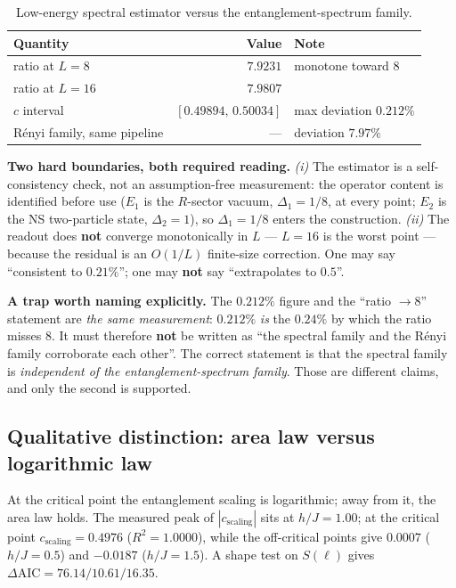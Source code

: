 \documentclass[11pt,a4paper]{article}
\begin{document}
\begin{table}[h]
\centering\small
\begin{tabular}{@{}lrl@{}}
\toprule
\textbf{Quantity} & \textbf{Value} & \textbf{Note} \\
\midrule
ratio at $L{=}8$  & $7.9231$ & monotone toward 8 \\
ratio at $L{=}16$ & $7.9807$ & \\
$c$ interval & $[0.49894,\,0.50034]$ & max deviation $0.212\%$ \\
Rényi family, same pipeline & --- & deviation $7.97\%$ \\
\bottomrule
\end{tabular}
\caption{Low-energy spectral estimator versus the entanglement-spectrum family.}
\label{tab:second}
\end{table}

\noindent\textbf{Two hard boundaries, both required reading.}
\emph{(i)} The estimator is a self-consistency check, not an assumption-free
measurement: the operator content is identified before use ($E_1$ is the $R$-sector
vacuum, $\Delta_1 = 1/8$, at every point; $E_2$ is the NS two-particle state,
$\Delta_2 = 1$), so $\Delta_1 = 1/8$ enters the construction.
\emph{(ii)} The readout does \textbf{not} converge monotonically in $L$ ---
$L{=}16$ is the worst point --- because the residual is an $O(1/L)$ finite-size
correction. One may say ``consistent to $0.21\%$''; one may \textbf{not} say
``extrapolates to $0.5$''.

\medskip
\noindent\textbf{A trap worth naming explicitly.} The $0.212\%$ figure and the
``ratio $\to 8$'' statement are \emph{the same measurement}: $0.212\%$ \emph{is}
the $0.24\%$ by which the ratio misses 8. It must therefore \textbf{not} be written
as ``the spectral family and the Rényi family corroborate each other''. The correct
statement is that the spectral family is \emph{independent of the
entanglement-spectrum family}. Those are different claims, and only the second is
supported.

\subsection{Qualitative distinction: area law versus logarithmic law}
\label{sec:arealaw}

At the critical point the entanglement scaling is logarithmic; away from it, the
area law holds. The measured peak of $|c_{\text{scaling}}|$ sits at $h/J = 1.00$;
at the critical point $c_{\text{scaling}} = 0.4976$ ($R^2 = 1.0000$), while the
off-critical points give $0.0007$ ($h/J = 0.5$) and $-0.0187$ ($h/J = 1.5$). A
shape test on $S(\ell)$ gives $\Delta\mathrm{AIC} = 76.14 / 10.61 / 16.35$.
\end{document}
